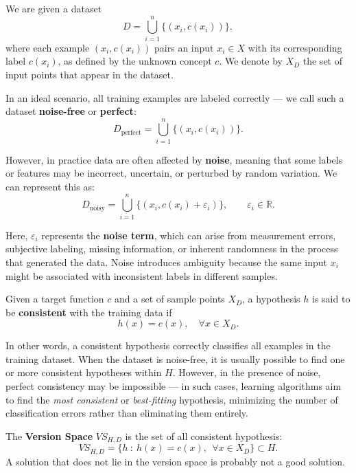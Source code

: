 \documentclass[10pt, letterpaper]{report}
\begin{document}
We are given a dataset
\begin{equation}
	D = \bigcup_{i=1}^{n} \{(x_i, c(x_i))\},
\end{equation}
where each example $(x_i, c(x_i))$ pairs an input $x_i \in X$ with its corresponding label $c(x_i)$, as defined by the unknown concept $c$. We denote by $X_D$ the set of input points that appear in the dataset.

\bigskip
In an ideal scenario, all training examples are labeled correctly — we call such a dataset \textbf{noise-free} or \textbf{perfect}:
\[
	D_{\text{perfect}} = \bigcup_{i=1}^n \{(x_i, c(x_i))\}.
\]

However, in practice data are often affected by \textbf{noise}, meaning that some labels or features may be incorrect, uncertain, or perturbed by random variation. We can represent this as:
\[
	D_{\text{noisy}} = \bigcup_{i=1}^n \{(x_i, c(x_i) + \varepsilon_i)\}, \qquad \varepsilon_i \in \mathbb{R}.
\]

Here, $\varepsilon_i$ represents the \textbf{noise term}, which can arise from measurement errors, subjective labeling, missing information, or inherent randomness in the process that generated the data. Noise introduces ambiguity because the same input $x_i$ might be associated with inconsistent labels in different samples.

\bigskip
\begin{definition}
	Given a target function $c$ and a set of sample points $X_D$, a hypothesis $h$ is said to be \textbf{consistent} with the training data if
	\[
		h(x) = c(x), \quad \forall x \in X_D.
	\]
\end{definition}

In other words, a consistent hypothesis correctly classifies all examples in the training dataset.
When the dataset is noise-free, it is usually possible to find one or more consistent hypotheses within $H$.
However, in the presence of noise, perfect consistency may be impossible — in such cases, learning algorithms aim to find the \emph{most consistent} or \emph{best-fitting} hypothesis, minimizing the number of classification errors rather than eliminating them entirely.

\bigskip
The \textbf{Version Space} $VS_{H,D}$ is the set of all consistent hypothesis:\begin{equation}
	VS_{H,D}=\{h \ : \ h(x)=c(x), \ \ \forall x\in X_D\}\subset H.
\end{equation}
A solution that does not lie in the version space is probably not a good solution.\bigskip
\end{document}

